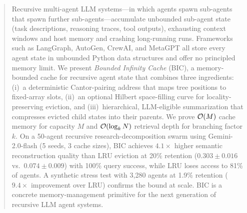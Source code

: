 
\begin{abstract}

Recursive multi-agent LLM systems---in which agents spawn sub-agents
that spawn further sub-agents---accumulate unbounded sub-agent state
(task descriptions, reasoning traces, tool outputs), exhausting
context windows and host memory and crashing long-running runs.
Frameworks such as LangGraph, AutoGen, CrewAI, and MetaGPT all store
every agent state in unbounded Python data structures and offer no
principled memory limit.  We present \emph{Bounded Infinity Cache}
(BIC), a memory-bounded cache for recursive agent state that combines
three ingredients: (i)~a deterministic Cantor-pairing address that
maps tree positions to fixed-array slots, (ii)~an optional Hilbert
space-filling curve for locality-preserving eviction, and
(iii)~hierarchical, LLM-eligible summarization that compresses
evicted child states into their parents.  We prove $\Oh(M)$ cache
memory for capacity $M$ and $\Oh(\log_k N)$ retrieval depth for
branching factor $k$.  On a 50-agent recursive research-decomposition
swarm using Gemini-2.0-flash (5 seeds, 3 cache sizes), BIC achieves
$4.1\times$ higher semantic reconstruction quality than LRU eviction
at 20\% retention ($0.303 \pm 0.016$ vs.\ $0.074 \pm 0.009$) with
100\% query success, while LRU loses access to 81\% of agents.  A
synthetic stress test with 3{,}280 agents at 1.9\% retention
($9.4\times$ improvement over LRU) confirms the bound at scale.  BIC
is a concrete memory-management primitive for the next generation of
recursive LLM agent systems.

\end{abstract}
